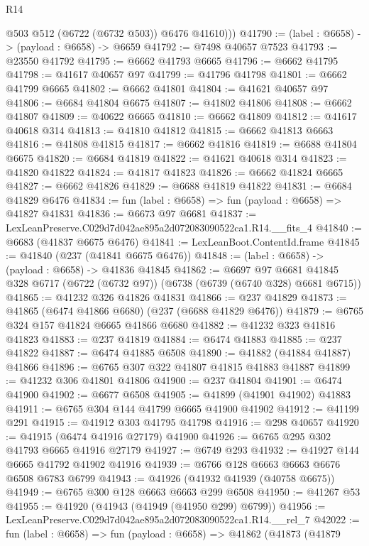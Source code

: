 \begin{lexlean}{R14}
\begin{coremodule}
          @503
          @512
          (@6722 (@6732 @503))
          @6476
          @41610)))
@41790 := (label : @6658) -> (payload : @6658) -> @6659
@41792 := @7498 @40657 @7523
@41793 := @23550 @41792
@41795 := @6662 @41793 @6665
@41796 := @6662 @41795
@41798 := @41617 @40657 @97
@41799 := @41796 @41798
@41801 := @6662 @41799 @6665
@41802 := @6662 @41801
@41804 := @41621 @40657 @97
@41806 := @6684 @41804 @6675
@41807 := @41802 @41806
@41808 := @6662 @41807
@41809 := @40622 @6665
@41810 := @6662 @41809
@41812 := @41617 @40618 @314
@41813 := @41810 @41812
@41815 := @6662 @41813 @6663
@41816 := @41808 @41815
@41817 := @6662 @41816
@41819 := @6688 @41804 @6675
@41820 := @6684 @41819
@41822 := @41621 @40618 @314
@41823 := @41820 @41822
@41824 := @41817 @41823
@41826 := @6662 @41824 @6665
@41827 := @6662 @41826
@41829 := @6688 @41819 @41822
@41831 := @6684 @41829 @6476
@41834 := fun (label : @6658) => fun (payload : @6658) => @41827 @41831
@41836 := @6673 @97 @6681
@41837 := LexLeanPreserve.C029d7d042ae895a2d072083090522ca1.R14.__fits_4
@41840 := @6683 (@41837 @6675 @6476)
@41841 := LexLeanBoot.ContentId.frame
@41845 := @41840 (@237 (@41841 @6675 @6476))
@41848 := (label : @6658) -> (payload : @6658) -> @41836 @41845
@41862 := @6697
    @97
    @6681
    @41845
    @328
    @6717
    (@6722 (@6732 @97))
    (@6738 (@6739 (@6740 @328) @6681 @6715))
@41865 := @41232 @326 @41826 @41831
@41866 := @237 @41829
@41873 := @41865 (@6474 @41866 @6680) (@237 (@6688 @41829 @6476))
@41879 := @6765 @324 @157 @41824 @6665 @41866 @6680
@41882 := @41232 @323 @41816 @41823
@41883 := @237 @41819
@41884 := @6474 @41883
@41885 := @237 @41822
@41887 := @6474 @41885 @6508
@41890 := @41882 (@41884 @41887) @41866
@41896 := @6765 @307 @322 @41807 @41815 @41883 @41887
@41899 := @41232 @306 @41801 @41806
@41900 := @237 @41804
@41901 := @6474 @41900
@41902 := @6677 @6508
@41905 := @41899 (@41901 @41902) @41883
@41911 := @6765 @304 @144 @41799 @6665 @41900 @41902
@41912 := @41199 @291
@41915 := @41912 @303 @41795 @41798
@41916 := @298 @40657
@41920 := @41915 (@6474 @41916 @27179) @41900
@41926 := @6765 @295 @302 @41793 @6665 @41916 @27179
@41927 := @6749 @293
@41932 := @41927 @144 @6665 @41792 @41902 @41916
@41939 := @6766 @128 @6663 @6663 @6676 @6508 @6783 @6799
@41943 := @41926 (@41932 @41939 (@40758 @6675))
@41949 := @6765 @300 @128 @6663 @6663 @299 @6508
@41950 := @41267 @53
@41955 := @41920 (@41943 (@41949 (@41950 @299) @6799))
@41956 := LexLeanPreserve.C029d7d042ae895a2d072083090522ca1.R14.__rel_7
@42022 := fun (label : @6658) =>
  fun (payload : @6658) =>
  @41862
    (@41873
      (@41879

\end{coremodule}
\end{lexlean}
